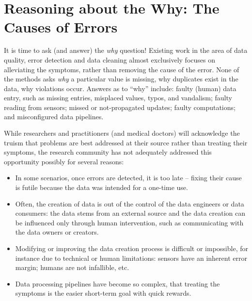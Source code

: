 \section{Reasoning about the Why: The Causes of Errors}
\label{sec:why}

It is time to ask (and answer) the \emph{why} question!
Existing work in the area of data quality, error detection and data cleaning almost exclusively focuses on alleviating the symptoms, rather than removing the cause of the error.
None of the methods asks \emph{why} a particular value is missing, why duplicates exist in the data, why violations occur. Answers as to ``why'' include: faulty (human) data entry, such as missing entries, misplaced values, typos, and vandalism; faulty reading from sensors; missed or not-propagated updates; faulty computations; and misconfigured data pipelines. 

While researchers and practitioners (and medical doctors) will acknowledge the truism that problems are best addressed at their source rather than treating their symptoms, the research community has not adequately addressed this opportunity possibly for several reasons:
\begin{itemize}
    \item In some scenarios, once errors are detected, it is too late -- fixing their cause is futile because the data was intended for a one-time use.
    \item Often, the creation of data is out of the control of the data engineers or data consumers: the data stems from an external source and the data creation can be influenced only through human intervention, such as communicating with the data owners or creators.
    \item Modifying or improving the data creation process is difficult or impossible, for instance due to technical or human limitations: sensors have an inherent error margin; humans are not infallible, etc.
    \item Data processing pipelines have become so complex, that treating the symptoms is the easier short-term goal with quick rewards.
\end{itemize}

